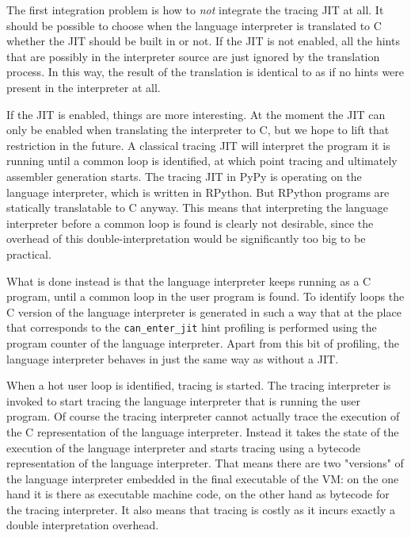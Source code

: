 \documentclass{acm_proc_article-sp}
\begin{document}
The first integration problem is how to \emph{not} integrate the tracing JIT at
all. It should be possible to choose when the language interpreter is translated to C
whether the JIT should be built in or not. If the JIT is not enabled, all the
hints that are possibly in the interpreter source are just ignored by the
translation process. In this way, the result of the translation is identical to
as if no hints were present in the interpreter at all.

If the JIT is enabled, things are more interesting. At the moment the JIT can
only be enabled when translating the interpreter to C, but we hope to lift that
restriction in the future. A classical tracing JIT will
interpret the program it is running until a common loop is identified, at which
point tracing and ultimately assembler generation starts. The tracing JIT in
PyPy is operating on the language interpreter, which is written in RPython. But
RPython programs are statically translatable to C anyway. This means that interpreting the
language interpreter before a common loop is found is clearly not desirable,
since the overhead of this double-interpretation would be significantly too big
to be practical.

What is done instead is that the language interpreter keeps running as a C
program, until a common loop in the user program is found. To identify loops the
C version of the language interpreter is generated in such a way that at the
place that corresponds to the \texttt{can\_enter\_jit} hint profiling is
performed using the program counter of the language interpreter. Apart from this
bit of profiling, the language interpreter behaves in just the same way as
without a JIT.

When a hot user loop is identified, tracing is started. The
tracing interpreter is invoked to start tracing the language interpreter that is
running the user program. Of course the tracing interpreter cannot actually
trace the execution of the C representation of the language interpreter. Instead
it takes the state of the execution of the language interpreter and starts
tracing using a bytecode representation of the language interpreter. That means
there are two "versions" of the language interpreter embedded in the final
executable of the VM: on the one hand it is there as executable machine code, on
the other hand as bytecode for the tracing interpreter. It also means that
tracing is costly as it incurs exactly a double interpretation overhead.
\end{document}
